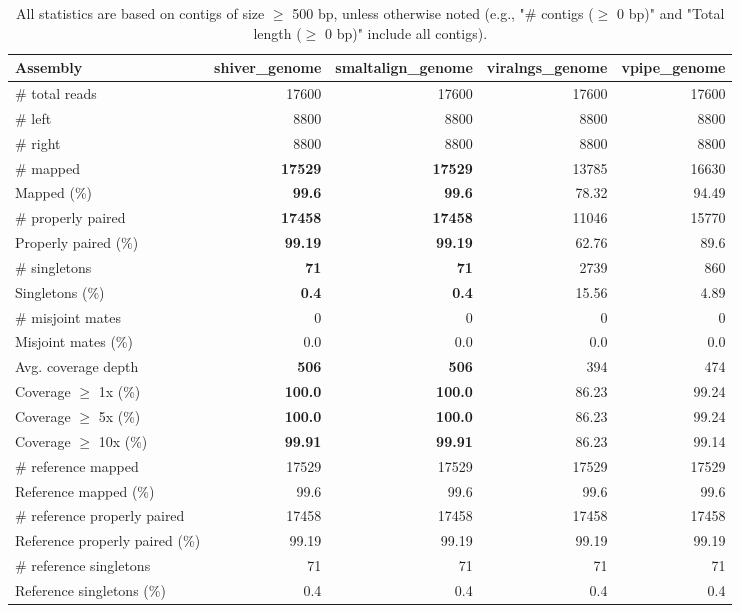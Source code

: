 \documentclass[12pt,a4paper]{article}
\begin{document}
\begin{table}[ht]
\begin{center}
\caption{All statistics are based on contigs of size $\geq$ 500 bp, unless otherwise noted (e.g., "\# contigs ($\geq$ 0 bp)" and "Total length ($\geq$ 0 bp)" include all contigs).}
\begin{tabular}{|l*{4}{|r}|}
\hline
Assembly & shiver\_genome & smaltalign\_genome & viralngs\_genome & vpipe\_genome \\ \hline
\# total reads & 17600 & 17600 & 17600 & 17600 \\ \hline
\# left & 8800 & 8800 & 8800 & 8800 \\ \hline
\# right & 8800 & 8800 & 8800 & 8800 \\ \hline
\# mapped & {\bf 17529} & {\bf 17529} & 13785 & 16630 \\ \hline
Mapped (\%) & {\bf 99.6} & {\bf 99.6} & 78.32 & 94.49 \\ \hline
\# properly paired & {\bf 17458} & {\bf 17458} & 11046 & 15770 \\ \hline
Properly paired (\%) & {\bf 99.19} & {\bf 99.19} & 62.76 & 89.6 \\ \hline
\# singletons & {\bf 71} & {\bf 71} & 2739 & 860 \\ \hline
Singletons (\%) & {\bf 0.4} & {\bf 0.4} & 15.56 & 4.89 \\ \hline
\# misjoint mates & 0 & 0 & 0 & 0 \\ \hline
Misjoint mates (\%) & 0.0 & 0.0 & 0.0 & 0.0 \\ \hline
Avg. coverage depth & {\bf 506} & {\bf 506} & 394 & 474 \\ \hline
Coverage $\geq$ 1x (\%) & {\bf 100.0} & {\bf 100.0} & 86.23 & 99.24 \\ \hline
Coverage $\geq$ 5x (\%) & {\bf 100.0} & {\bf 100.0} & 86.23 & 99.24 \\ \hline
Coverage $\geq$ 10x (\%) & {\bf 99.91} & {\bf 99.91} & 86.23 & 99.14 \\ \hline
\# reference mapped & 17529 & 17529 & 17529 & 17529 \\ \hline
Reference mapped (\%) & 99.6 & 99.6 & 99.6 & 99.6 \\ \hline
\# reference properly paired & 17458 & 17458 & 17458 & 17458 \\ \hline
Reference properly paired (\%) & 99.19 & 99.19 & 99.19 & 99.19 \\ \hline
\# reference singletons & 71 & 71 & 71 & 71 \\ \hline
Reference singletons (\%) & 0.4 & 0.4 & 0.4 & 0.4 \\ \hline

\end{tabular}
\end{center}
\end{table}
\end{document}
